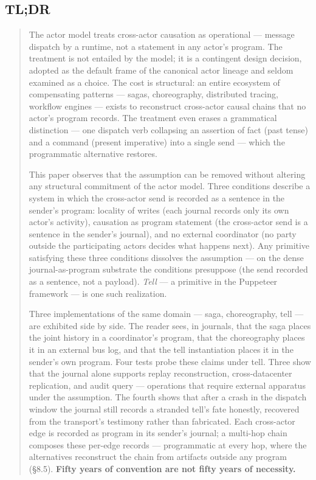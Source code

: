 \documentclass[
]{article}
\begin{document}
\subsection{TL;DR}\label{tldr}

\begin{quote}
The actor model treats cross-actor causation as operational --- message
dispatch by a runtime, not a statement in any actor's program. The
treatment is not entailed by the model; it is a contingent design
decision, adopted as the default frame of the canonical actor lineage
and seldom examined as a choice. The cost is structural: an entire
ecosystem of compensating patterns --- sagas, choreography, distributed
tracing, workflow engines --- exists to reconstruct cross-actor causal
chains that no actor's program records. The treatment even erases a
grammatical distinction --- one dispatch verb collapsing an assertion of
fact (past tense) and a command (present imperative) into a single send
--- which the programmatic alternative restores.

This paper observes that the assumption can be removed without altering
any structural commitment of the actor model. Three conditions describe
a system in which the cross-actor send is recorded as a sentence in the
sender's program: locality of writes (each journal records only its own
actor's activity), causation as program statement (the cross-actor send
is a sentence in the sender's journal), and no external coordinator (no
party outside the participating actors decides what happens next). Any
primitive satisfying these three conditions dissolves the assumption ---
on the dense journal-as-program substrate the conditions presuppose (the
send recorded as a sentence, not a payload). \emph{Tell} --- a primitive
in the Puppeteer framework --- is one such realization.

Three implementations of the same domain --- saga, choreography, tell
--- are exhibited side by side. The reader sees, in journals, that the
saga places the joint history in a coordinator's program, that the
choreography places it in an external bus log, and that the tell
instantiation places it in the sender's own program. Four tests probe
these claims under tell. Three show that the journal alone supports
replay reconstruction, cross-datacenter replication, and audit query ---
operations that require external apparatus under the assumption. The
fourth shows that after a crash in the dispatch window the journal still
records a stranded tell's fate honestly, recovered from the transport's
testimony rather than fabricated. Each cross-actor edge is recorded as
program in its sender's journal; a multi-hop chain composes these
per-edge records --- programmatic at every hop, where the alternatives
reconstruct the chain from artifacts outside any program (§8.5).
\textbf{Fifty years of convention are not fifty years of necessity.}
\end{quote}
\end{document}
